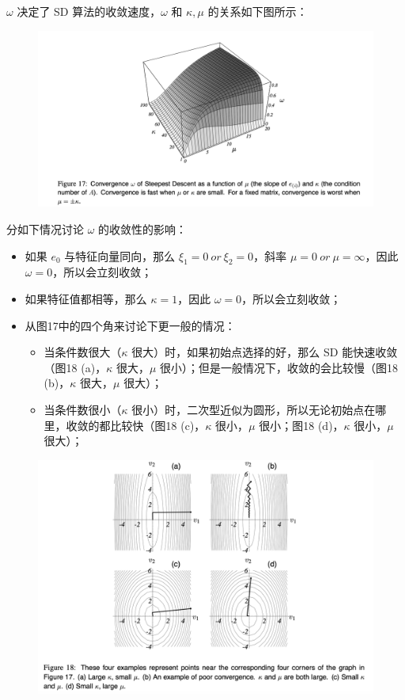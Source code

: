 \documentclass[12pt]{article}
\begin{document}
$\omega$ 决定了 SD 算法的收敛速度，$\omega$ 和 $\kappa, \mu$ 的关系如下图所示：
\begin{figure}[H]
    \centering
    \includegraphics[width=1\textwidth]{fig/CG_Convergence_SD_3.png}
\end{figure}

分如下情况讨论 $\omega$ 的收敛性的影响：
\begin{itemize}
\setlength{\itemsep}{0pt}
\setlength{\parsep}{0pt}
\setlength{\parskip}{0pt}
    \item 如果 $e_0$ 与特征向量同向，那么 $\xi_1 = 0 \ or \ \xi_2 = 0$，斜率 $\mu = 0 \ or \ \mu = \infty$，因此 $\omega = 0$，所以会立刻收敛；
    \item 如果特征值都相等，那么 $\kappa = 1$，因此 $\omega = 0$，所以会立刻收敛；
    \item 从图17中的四个角来讨论下更一般的情况：
    \begin{itemize}
	\setlength{\itemsep}{0pt}
	\setlength{\parsep}{0pt}
	\setlength{\parskip}{0pt}
   	 \item 当条件数很大（$\kappa$ 很大）时，如果初始点选择的好，那么 SD 能快速收敛（图18 (a)，$\kappa$ 很大，$\mu$ 很小）；但是一般情况下，收敛的会比较慢（图18 (b)，$\kappa$ 很大，$\mu$ 很大）；
	 \item 当条件数很小（$\kappa$ 很小）时，二次型近似为圆形，所以无论初始点在哪里，收敛的都比较快（图18 (c)，$\kappa$ 很小，$\mu$ 很小；图18 (d)，$\kappa$ 很小，$\mu$ 很大）；
\end{itemize}
\end{itemize}
\begin{figure}[H]
    \centering
    \includegraphics[width=1\textwidth]{fig/CG_Convergence_SD_4.png}
\end{figure}
\end{document}
